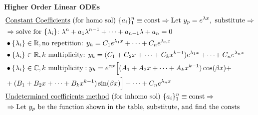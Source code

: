 \textbf{Higher Order Linear ODEs}
\begin{align*}
    &\underline{\text{Constant Coefficients}} \text{ (for homo sol)} \ \{a_i\}_1^n\equiv \text{const} \Rightarrow \text{Let }y_p=e^{\lambda x}, \text{ substitute}\Rightarrow\\
    &\Rightarrow\text{solve for $\{\lambda_i\}$:} \ \lambda^{n} + a_1 \lambda^{n-1}+\cdots+ a_{n-1}\lambda+a_{n}=0\\
    &\bullet \{\lambda_i\} \in \mathbb{R}, \text{no repetition: }y_h= C_1e^{\lambda_1x}+ \cdots+C_ne^{\lambda_n x}\\
    &\bullet  \{\lambda_i\} \in \mathbb{R}, k\text{ multiplicity: }y_h=(C_1+C_2x+\cdots+C_kx^{k-1})e^{\lambda_1x}+\!\cdots\!+C_ne^{\lambda_nx}\\
    &\bullet  \{\lambda_i\} \in \mathbb{C}, k\text{ multiplicity}: y_h=e^{\alpha x}\Big[(A_1+A_2 x +\cdots + A_kx^{k-1})\cos(\beta x) + \\
    &+(B_1+B_2x + \cdots+ B_kx^{k-1})\sin (\beta x)\Big] + \cdots + C_ne^{\lambda_n x}\\
    &\underline{\text{Undetermined coefficients method}} \text{ (for inhomo sol) }\{a_i\}_1^n\equiv \text{const} \Rightarrow \\
    &\Rightarrow \text{Let $ y_p$ be the function shown in the table, substitute, and find the consts}
    \end{align*} 
    \vspace{-15pt}
